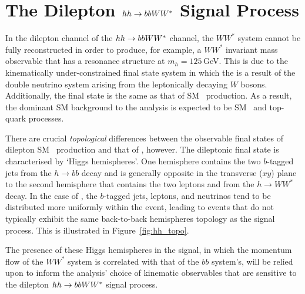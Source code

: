 \section{The Dilepton $hh \rightarrow bbWW^*$ Signal Process}
\label{sec:hh_pheno}

In the dilepton channel of the $hh \rightarrow bbWW^*$ channel, the $WW^*$ system
cannot be fully reconstructed in order to produce, for example, a $WW^*$ invariant
mass observable that has a resonance structure at $m_h = 125$\,GeV.
This is due to the
kinematically under-constrained final state system in which the \met is a result of the double neutrino system
arising from the leptonically decaying $W$ bosons.
Additionally, the final state is the same as that of SM \ttbar~production.
As a result, the dominant SM background to the analysis is expected to be SM \ttbar~and top-quark processes.

There are crucial \textit{topological} differences between the observable final states of dilepton SM \ttbar~production and
that of \bbww, however.
The dileptonic \bbww final state is characterised by `Higgs hemispheres'.
One hemisphere contains the two $b$-tagged jets from the $h \rightarrow bb$ decay and is generally
opposite in the transverse ($xy$) plane to the second hemisphere that contains the two leptons
and \met from the $h \rightarrow WW^*$ decay.
In the case of \ttbar, the $b$-tagged jets, leptons, and neutrinos tend to be distributed more uniformly
within the event, leading to events that do not typically exhibit the same back-to-back hemispheres
topology as the \bbww signal process.
This is illustrated in Figure~\ref{fig:hh_topo}.

The presence of these Higgs hemispheres in the signal, in which the momentum flow of the $WW^*$ system
is correlated with that of the $bb$ system's, will be relied upon to inform the analysis' choice
of kinematic observables that are sensitive to the dilepton $hh \rightarrow bbWW^*$ signal process.

